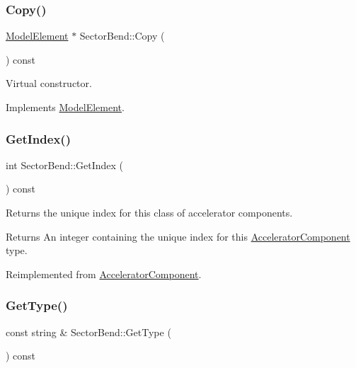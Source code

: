 \subsubsection{\texorpdfstring{Copy()}{Copy()}}
{\footnotesize\ttfamily \hyperlink{classModelElement}{Model\+Element} $\ast$ Sector\+Bend\+::\+Copy (\begin{DoxyParamCaption}{ }\end{DoxyParamCaption}) const\hspace{0.3cm}{\ttfamily [virtual]}}

Virtual constructor. 

Implements \hyperlink{classModelElement_ac3ca26d649bd86a0f31a58ae09941429}{Model\+Element}.

\mbox{\label{classSectorBend_a1af1ee7a97aa40bc6def14dec661eb3e}} 
\subsubsection{\texorpdfstring{Get\+Index()}{GetIndex()}}
{\footnotesize\ttfamily int Sector\+Bend\+::\+Get\+Index (\begin{DoxyParamCaption}{ }\end{DoxyParamCaption}) const\hspace{0.3cm}{\ttfamily [virtual]}}

Returns the unique index for this class of accelerator components. \begin{DoxyReturn}{Returns}
An integer containing the unique index for this \hyperlink{classAcceleratorComponent}{Accelerator\+Component} type. 
\end{DoxyReturn}


Reimplemented from \hyperlink{classAcceleratorComponent_abd1490171ac9af6004d3da01fb3b95fb}{Accelerator\+Component}.

\mbox{\label{classSectorBend_a4721383872aa001dc557acb546f25929}} 
\subsubsection{\texorpdfstring{Get\+Type()}{GetType()}}
{\footnotesize\ttfamily const string \& Sector\+Bend\+::\+Get\+Type (\begin{DoxyParamCaption}{ }\end{DoxyParamCaption}) const\hspace{0.3cm}{\ttfamily [virtual]}}

